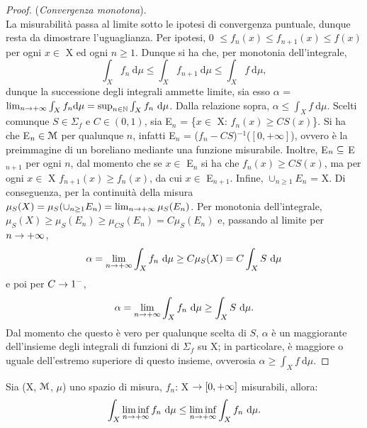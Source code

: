 \documentclass[Completo.tex]{subfiles}
\begin{document}
\begin{proof}
	(\textit{Convergenza monotona}). \\
	La misurabilità passa al limite sotto le ipotesi di convergenza puntuale, dunque resta da dimostrare l'uguaglianza. Per ipotesi, 0 $\leq f_n(x) \leq f_{n+1}(x) \leq f(x)$ per ogni $x \in$ X ed ogni $n \geq 1$. Dunque si ha che, per monotonia dell'integrale,
	\begin{equation*}
	\int_X f_n \ \mathrm{d}\mu \leq \int_X f_{n+1} \ \mathrm{d}\mu \leq \int_X f \ \mathrm{d}\mu,
	\end{equation*}
	dunque la successione degli integrali ammette limite, sia esso $\alpha$ = $\lim_{n \ra +\infty} \int_X f_n \mathrm{d}\mu = \sup_{n \in \bb[N]} \int_X f_n \ \mathrm{d}\mu$. Dalla relazione sopra, $\alpha \leq \int_X f \ \mathrm{d}\mu$. Scelti comunque $S \in \Sigma_f$ e $C \in (0,1)$, sia E$_n$ = \{$x \in$ X: $f_n(x) \geq CS(x)$\}. Si ha che E$_n \in \eu[M]$ per qualunque $n$, infatti E$_n$ = ($f_n - CS$)$^{-1}$($[0, +\infty]$), ovvero è la preimmagine di un boreliano mediante una funzione misurabile. Inoltre, E$_n \subseteq$ E$_{n+1}$ per ogni $n$, dal momento che se $x \in$ E$_n$ si ha che $f_n(x) \geq CS(x)$, ma per ogni $x \in$ X $f_{n+1}(x) \geq f_n(x)$, da cui $x \in$ E$_{n+1}$. Infine, $\cup_{n\geq1} E_n$ = X. Di conseguenza, per la continuità della misura $\mu_S(X) = \mu_S(\cup_{n\geq1}E_n) = \lim_{n \rightarrow +\infty} \mu_S(E_n)$. Per monotonia dell'integrale, $\mu_S(X) \geq \mu_S(E_n) \geq \mu_{CS}(E_n) = C\mu_S(E_n)$ e, passando al limite per $n \rightarrow +\infty$,
	\begin{equation*}
	\alpha = \lim_{n \ra +\infty} \int_X f_n \ \mathrm{d}\mu \geq C \mu_S(X) = C \int_X S \ \mathrm{d}\mu
	\end{equation*}
	e poi per $C \rightarrow 1^{-}$,
	\begin{equation*}
	\alpha = \lim_{n \ra +\infty} \int_X f_n \ \mathrm{d}\mu \geq \int_X S \ \mathrm{d}\mu.
	\end{equation*}
	Dal momento che questo è vero per qualunque scelta di $S$, $\alpha$ è un maggiorante dell'insieme degli integrali di funzioni di $\Sigma_f$ su X; in particolare, è maggiore o uguale dell'estremo superiore di questo insieme, ovverosia $\alpha \geq \int_X f \ \mathrm{d}\mu$.
\end{proof}
\begin{eTh}[Fatou]
	Sia (X, $\eu[M]$, $\mu$) uno spazio di misura, $f_n$: X $\rightarrow [0, +\infty]$ misurabili, allora:
	\begin{equation*}
	\int_X \liminf_{n \ra +\infty} f_n \ \mathrm{d}\mu \leq \liminf_{n \ra +\infty} \int_X f_n \ \mathrm{d}\mu.
	\end{equation*}
\end{eTh}
\end{document}
